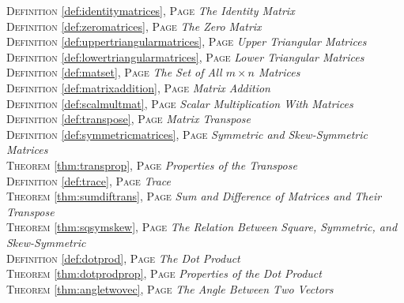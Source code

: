 \begin{multicols}{2}
{\textsc{Definition} \ref{def:identitymatrices}, \textsc{Page} \pageref{def:identitymatrices} \textit{The Identity Matrix} \\
\textsc{Definition} \ref{def:zeromatrices}, \textsc{Page} \pageref{def:zeromatrices} \textit{The Zero Matrix} \\
\textsc{Definition} \ref{def:uppertriangularmatrices}, \textsc{Page} \pageref{def:uppertriangularmatrices} \textit{Upper Triangular Matrices} \\
\textsc{Definition} \ref{def:lowertriangularmatrices}, \textsc{Page} \pageref{def:lowertriangularmatrices} \textit{Lower Triangular Matrices} \\
\textsc{Definition} \ref{def:matset}, \textsc{Page} \pageref{def:matset} \textit{The Set of All \(m\times n\) Matrices} \\
\textsc{Definition} \ref{def:matrixaddition}, \textsc{Page} \pageref{def:matrixaddition} \textit{Matrix Addition} \\
\textsc{Definition} \ref{def:scalmultmat}, \textsc{Page} \pageref{def:scalmultmat} \textit{Scalar Multiplication With Matrices} \\
\textsc{Definition} \ref{def:transpose}, \textsc{Page} \pageref{def:transpose} \textit{Matrix Transpose} \\
\textsc{Definition} \ref{def:symmetricmatrices}, \textsc{Page} \pageref{def:symmetricmatrices} \textit{Symmetric and Skew-Symmetric Matrices} \\
\textsc{Theorem} \ref{thm:transprop}, \textsc{Page} \pageref{thm:transprop} \textit{Properties of the Transpose} \\
\textsc{Definition} \ref{def:trace}, \textsc{Page} \pageref{def:trace} \textit{Trace} \\
\textsc{Theorem} \ref{thm:sumdiftrans}, \textsc{Page} \pageref{thm:sumdiftrans} \textit{Sum and Difference of Matrices and Their Transpose} \\
\textsc{Theorem} \ref{thm:sqsymskew}, \textsc{Page} \pageref{thm:sqsymskew} \textit{The Relation Between Square, Symmetric, and Skew-Symmetric} \\
\textsc{Definition} \ref{def:dotprod}, \textsc{Page} \pageref{def:dotprod} \textit{The Dot Product} \\
\textsc{Theorem} \ref{thm:dotprodprop}, \textsc{Page} \pageref{thm:dotprodprop} \textit{Properties of the Dot Product} \\
\textsc{Theorem} \ref{thm:angletwovec}, \textsc{Page} \pageref{thm:angletwovec} \textit{The Angle Between Two Vectors} \\
}
\end{multicols}
